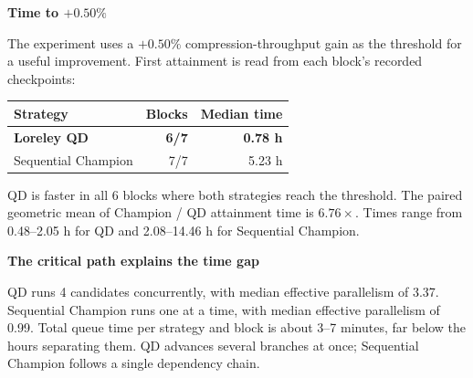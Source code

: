 \documentclass[10pt,a4paper]{article}
\begin{document}
\begin{minipage}[t]{0.48\textwidth}
{\color{ink}\large\bfseries Time to $+0.50\%$}\par
\small
The experiment uses a $+0.50\%$ compression-throughput gain as the threshold for a useful improvement. First attainment is read from each block's recorded checkpoints:
\vspace{3pt}

\begin{tabularx}{\linewidth}{@{}Y r r@{}}
\toprule
Strategy & Blocks & Median time \\
\midrule
\textbf{Loreley QD} & \textbf{6/7} & \textbf{0.78 h} \\
Sequential Champion & 7/7 & 5.23 h \\
\bottomrule
\end{tabularx}

\vspace{3pt}
QD is faster in all 6 blocks where both strategies reach the threshold. The paired geometric mean of Champion / QD attainment time is $6.76\times$. Times range from 0.48--2.05 h for QD and 2.08--14.46 h for Sequential Champion.

\vspace{5pt}
{\color{ink}\bfseries The critical path explains the time gap}\par
QD runs 4 candidates concurrently, with median effective parallelism of 3.37. Sequential Champion runs one at a time, with median effective parallelism of 0.99. Total queue time per strategy and block is about 3--7 minutes, far below the hours separating them. QD advances several branches at once; Sequential Champion follows a single dependency chain.
\end{minipage}\hfill
\end{document}
